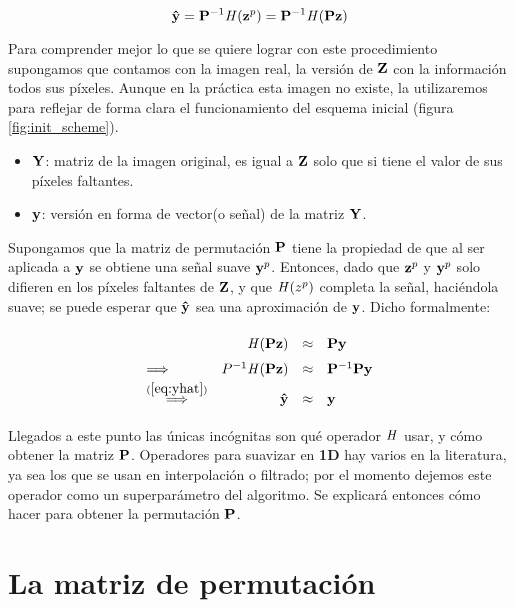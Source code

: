 \begin{equation}
\yhat = \P^{-1}\H(\z^p) = \P^{-1}\H(\P\z)
\label{eq:yhat}
\end{equation}

Para comprender mejor lo que se quiere lograr con este procedimiento supongamos que contamos con la imagen real, la versi\'on de $\Z$ con la informaci\'on todos sus p\'ixeles. Aunque en la pr\'actica esta imagen no existe, la utilizaremos para reflejar de forma clara el funcionamiento del esquema inicial (figura \ref{fig:init_scheme}).

\begin{itemize}
	\item $\Y$: matriz de la imagen original, es igual a $\Z$ solo que si tiene el valor de sus p\'ixeles faltantes. 
	\item $\y$: versión en forma de vector(o señal) de la matriz $\Y$.
\end{itemize}

Supongamos que la matriz de permutaci\'on $\P$ tiene la propiedad de que al ser aplicada a $\y$ se obtiene una señal suave $\y^p$. Entonces, dado que $\z^p$ y $\y^p$ solo difieren en los p\'ixeles faltantes de $\Z$, y que $\H(z^p)$ completa la señal, haciéndola suave; se puede esperar que $\yhat$ sea una aproximaci\'on de $\y$. Dicho formalmente:

\begin{equation}
	\def\arraystretch{1.5}
	\begin{array}{lrcl}
	                                           &     \H (\P\z ) &\approx& \P\y        \\ 
	\Longrightarrow                            & P^{-1}\H(\P\z) &\approx& \P^{-1}\P\y \\
	\overset{(\ref{eq:yhat})}{\Longrightarrow} &          \yhat &\approx& \y          \\
	\end{array}
	\label{eq:permutation_smoothness}
\end{equation}

Llegados a este punto las únicas incógnitas son qu\'e operador $\H$ usar, y c\'omo obtener la matriz $\P$. Operadores para suavizar en \textbf{1D} hay varios en la literatura, ya sea los que se usan en interpolaci\'on o filtrado; por el momento dejemos este operador como un superpar\'ametro del algoritmo. Se explicar\'a entonces c\'omo hacer para obtener la permutaci\'on $\P$.

\section{La matriz de permutaci\'on}

